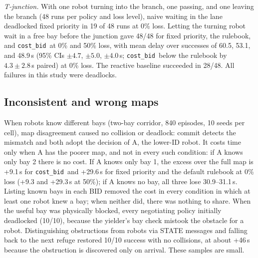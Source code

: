 \documentclass[letterpaper,journal]{IEEEtran}
\newcommand{\cb}{\texttt{cost\_bid}}
\begin{document}
\emph{T-junction.} With one robot turning into the branch, one passing, and one leaving the branch (48 runs per policy and loss level), naive waiting in the lane deadlocked fixed priority in 19 of 48 runs at 0\% loss. Letting the turning robot wait in a free bay before the junction gave 48/48 for fixed priority, the rulebook, and \cb\ at 0\% and 50\% loss, with mean delay over successes of 60.5, 53.1, and 48.9\,s (95\% CIs $\pm4.7$, $\pm5.0$, $\pm4.0$\,s; \cb\ below the rulebook by $4.3\pm2.8$\,s paired) at 0\% loss. %
The reactive baseline succeeded in 28/48. All failures in this study were deadlocks.

\subsection{Inconsistent and wrong maps}\label{sec:maps}
When robots know different bays (two-bay corridor, 840 episodes, 10 seeds per cell), map disagreement caused no collision or deadlock: commit detects the mismatch and both adopt the decision of A, the lower-ID robot. It costs time only when A has the poorer map, and not in every such condition: if A knows only bay 2 there is no cost. If A knows only bay 1, the excess over the full map is +9.1\,s for \cb\ and +29.6\,s for fixed priority and the default rulebook at 0\% loss (+9.3 and +29.3\,s at 50\%); if A knows no bay, all three lose 30.9--31.1\,s. Listing known bays in each BID removed the cost in every condition in which at least one robot knew a bay; when neither did, there was nothing to share. When the useful bay was physically blocked, every negotiating policy initially deadlocked (10/10), because the yielder's bay check mistook the obstacle for a robot. Distinguishing obstructions from robots via STATE messages and falling back to the next refuge restored 10/10 success with no collisions, at about +46\,s because the obstruction is discovered only on arrival. These samples are small.
\end{document}
